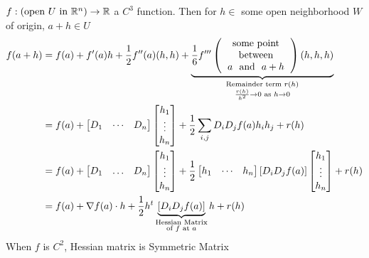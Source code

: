 $f:(\text{open }U\text{ in }\mathbb{R}^n )\to \mathbb{R}$ a $C^3$ function. Then  for $h\in $ some  open neighborhood $W$ of origin, $a+h\in U$ \begin{align*}
	f(a+h) & =f(a)+f'(a)h+\frac12f''(a)(h,h)+\underbrace{\frac16f'''\lt(\begin{tabular}{c}
		  \text{some point}    \\
		    \text{between}     \\
		$a$ \text{ and } $a+h$
	\end{tabular}\rt)(h,h,h)}_{\substack{ \text{Remainder term }r(h) \\ \frac{r(h)}{h^2}\to 0 \text{ as }h\to 0}} \\
	& = f(a)+\lt[ \begin{matrix}
		D_1 & \cdots & D_n
	\end{matrix} \rt]\lt[ \begin{matrix}
	h_1\\ \vdots \\ h_n
\end{matrix} \rt]+\frac12 \sum_{i,j}D_iD_jf(a)h_ih_j+r(h)\\
&=  f(a)+\lt[ \begin{matrix}
	D_1 & \dots & D_n
\end{matrix} \rt]\lt[ \begin{matrix}
	h_1\\ \vdots \\ h_n
\end{matrix} \rt] +\frac12 \lt[ \begin{matrix}
h_1& \cdots & h_n
\end{matrix}\rt][D_iD_jf(a)] \lt[ \begin{matrix}
h_1\\ \vdots\\ h_n
\end{matrix} \rt]+r(h)\\
&=f(a)+\nabla f(a)\cdot h+\frac12 h^t \underbrace{[D_iD_jf(a)]}_{\substack{\text{Hessian Matrix}\\ \text{of }f\text{ at }a}}h+r(h)
\end{align*}
When $f$ is $C^2$, Hessian matrix is Symmetric Matrix

